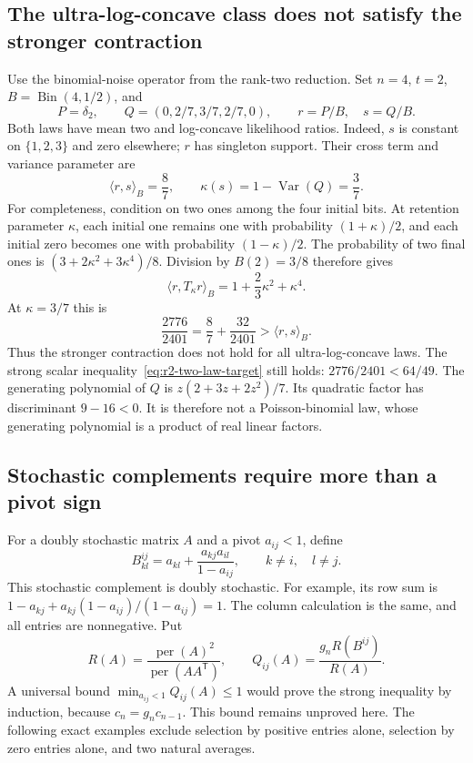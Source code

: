 \documentclass[11pt,a4paper]{article}
\theoremstyle{definition}
\theoremstyle{remark}
\newcommand{\per}{\operatorname{per}}
\newcommand{\T}{\mathsf{T}}
\begin{document}
\subsection{The ultra-log-concave class does not satisfy the stronger contraction}

Use the binomial-noise operator from the rank-two reduction.
Set $n=4$, $t=2$, $B=\operatorname{Bin}(4,1/2)$, and
\[
 P=\delta_2,\qquad Q=(0,2/7,3/7,2/7,0),\qquad r=P/B,\quad s=Q/B.
\]
Both laws have mean two and log-concave likelihood ratios.
Indeed, $s$ is constant on $\{1,2,3\}$ and zero elsewhere; $r$ has singleton
support. Their cross term and variance parameter are
\[
 \langle r,s\rangle_B=\frac87,\qquad
 \kappa(s)=1-\operatorname{Var}(Q)=\frac37.
\]
For completeness, condition on two ones among the four initial bits.
At retention parameter $\kappa$, each initial one remains one with
probability $(1+\kappa)/2$, and each initial zero becomes one with
probability $(1-\kappa)/2$.
The probability of two final ones is
$(3+2\kappa^2+3\kappa^4)/8$.
Division by $B(2)=3/8$ therefore gives
\[
 \langle r,T_\kappa r\rangle_B=1+\frac23\kappa^2+\kappa^4.
\]
At $\kappa=3/7$ this is
\[
 \frac{2776}{2401}=\frac87+\frac{32}{2401}>\langle r,s\rangle_B.
\]
Thus the stronger contraction does not hold for all ultra-log-concave laws.
The strong scalar inequality~\eqref{eq:r2-two-law-target} still holds: $2776/2401<64/49$.
The generating polynomial of $Q$ is $z(2+3z+2z^2)/7$.
Its quadratic factor has discriminant $9-16<0$.
It is therefore not a Poisson-binomial law, whose generating polynomial
is a product of real linear factors.

\subsection{Stochastic complements require more than a pivot sign}

For a doubly stochastic matrix $A$ and a pivot $a_{ij}<1$, define
\[
 B^{ij}_{kl}=a_{kl}+\frac{a_{kj}a_{il}}{1-a_{ij}},
 \qquad k\ne i,\quad l\ne j.
\]
This stochastic complement is doubly stochastic.
For example, its row sum is
$1-a_{kj}+a_{kj}(1-a_{ij})/(1-a_{ij})=1$.
The column calculation is the same, and all entries are nonnegative.
Put
\[
 R(A)=\frac{\per(A)^2}{\per(AA^\T)},\qquad
 Q_{ij}(A)=\frac{g_nR(B^{ij})}{R(A)}.
\]
A universal bound $\min_{a_{ij}<1}Q_{ij}(A)\le1$ would prove the strong
inequality by induction, because $c_n=g_nc_{n-1}$.
This bound remains unproved here.
The following exact examples exclude selection by positive entries alone,
selection by zero entries alone, and two natural averages.
\end{document}
